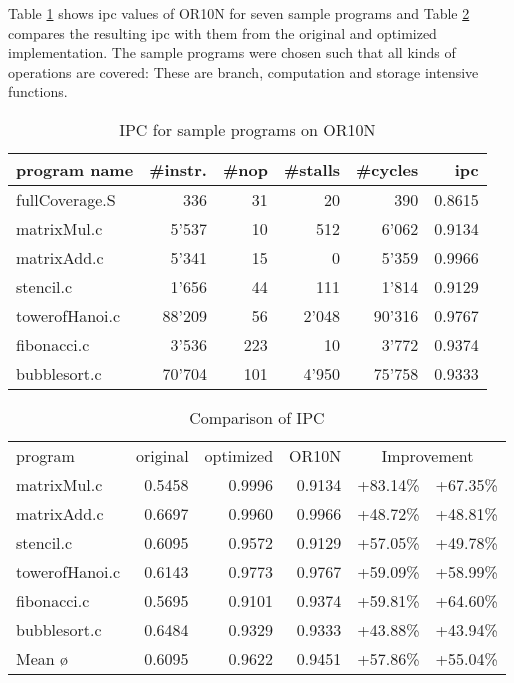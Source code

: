 Table \ref{tab:ipc} shows \gls{ipc} values of OR10N for seven sample programs and Table \ref{tab:ipc_comp} compares the resulting \gls{ipc} with them from the original and optimized implementation. The sample programs were chosen such that all kinds of operations are covered: These are branch, computation and storage intensive functions.
\begin{table}[htbp]
 \caption{IPC for sample programs on OR10N}
 \label{tab:ipc}
\centering\begin{tabular}{|l|r|r|r|r|r|} \hline
program name & \#instr. & \#nop & \#stalls & \#cycles & \gls{ipc} \\ \hline
fullCoverage.S   & 336  & 31 &    20 &    390 & 0.8615 \\ \hline
matrixMul.c    & 5'537  & 10 &   512 &  6'062 & 0.9134 \\ \hline
matrixAdd.c    & 5'341  & 15 &     0 &  5'359 & 0.9966 \\ \hline
stencil.c      & 1'656  & 44 &   111 &  1'814 & 0.9129 \\ \hline
towerofHanoi.c& 88'209  & 56 & 2'048 & 90'316 & 0.9767 \\ \hline
fibonacci.c    & 3'536 & 223 &    10 &  3'772 & 0.9374 \\ \hline
bubblesort.c &  70'704 & 101 & 4'950 & 75'758 & 0.9333 \\ \hline
\end{tabular}
\end{table}


\begin{table}[htbp]
 \caption{Comparison of IPC}
 \label{tab:ipc_comp}
\centering\begin{tabular}{|l|r|r|r||r|r|} \hline
program & original & optimized & OR10N & \multicolumn{2}{c|}{Improvement} \\ \cline{1-4} \cline{5-6}
matrixMul.c & 0.5458 & 0.9996 & 0.9134 & +83.14\% & +67.35\% \\ \hline
matrixAdd.c & 0.6697 & 0.9960 & 0.9966 & +48.72\% & +48.81\% \\ \hline
stencil.c & 0.6095 & 0.9572 & 0.9129 & +57.05\% & +49.78\% \\ \hline
towerofHanoi.c & 0.6143 & 0.9773 & 0.9767 & +59.09\% & +58.99\% \\ \hline
fibonacci.c & 0.5695 & 0.9101 & 0.9374 & +59.81\% & +64.60\% \\ \hline
bubblesort.c & 0.6484 & 0.9329 & 0.9333 & +43.88\% & +43.94\% \\ \hline\hline
Mean \o & 0.6095 & 0.9622 & 0.9451 & +57.86\% & +55.04\% \\ \hline
\end{tabular}
\end{table}


